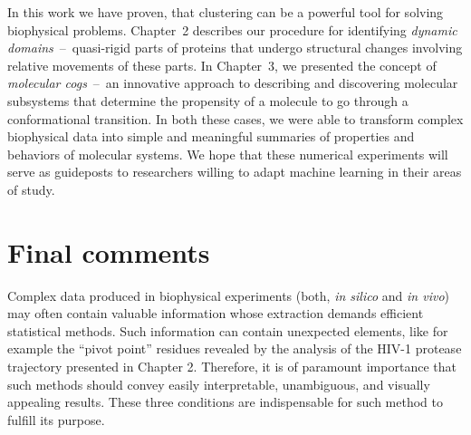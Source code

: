 \documentclass[a4paper,11pt,twoside]{book}%
\begin{document}
In this work we have proven, that clustering can be a powerful tool for solving biophysical problems.
Chapter~2 describes our procedure for identifying \emph{dynamic domains}~--~quasi-rigid parts of proteins that undergo structural changes involving relative movements of these parts.
In Chapter~3, we presented the concept of \emph{molecular cogs}~--~an innovative approach to describing and discovering molecular subsystems that determine the propensity of a molecule to go through a conformational transition.
In both these cases, we were able to transform complex biophysical data into simple and meaningful summaries of properties and behaviors of molecular systems.
We hope that these numerical experiments will serve as guideposts to researchers willing to adapt machine learning in their areas of study.

\section{Final comments}

Complex data produced in biophysical experiments (both, \emph{in silico} and \emph{in vivo}) may often contain valuable information whose extraction demands efficient statistical methods.
Such information can contain unexpected elements, like for example the ``pivot point'' residues revealed by the analysis of the HIV-1 protease trajectory presented in Chapter 2.
Therefore, it is of paramount importance that such methods should convey easily interpretable, unambiguous, and visually appealing results.
These three conditions are indispensable for such method to fulfill its purpose.
\end{document}
